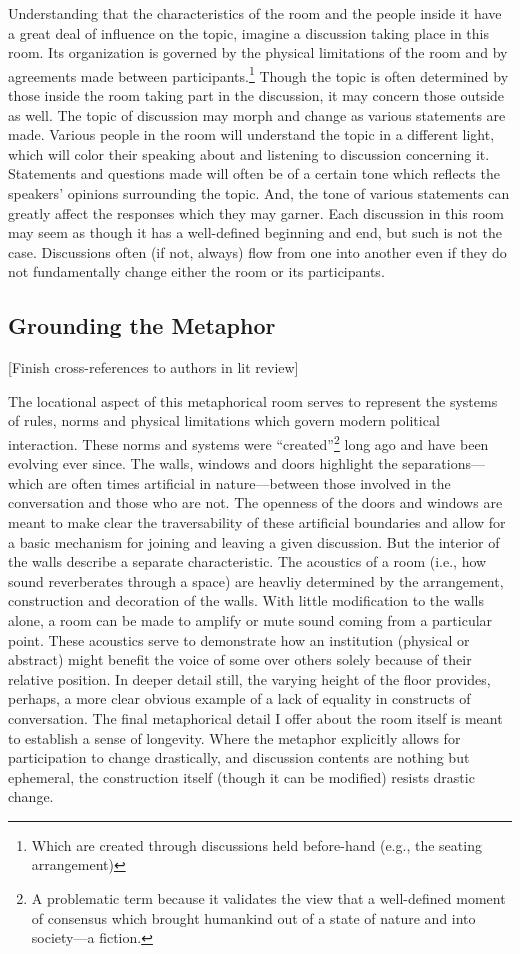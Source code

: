 \documentclass{article}
\begin{document}
Understanding that the characteristics of the room and the people inside it have a great deal of influence on the topic, imagine a discussion taking place in this room.
Its organization is governed by the physical limitations of the room and by agreements made between participants.\footnote{Which are created through discussions held before-hand (e.g., the seating arrangement)}
Though the topic is often determined by those inside the room taking part in the discussion, it may concern those outside as well.
The topic of discussion may morph and change as various statements are made.
Various people in the room will understand the topic in a different light, which will color their speaking about and listening to discussion concerning it.
Statements and questions made will often be of a certain tone which reflects the speakers' opinions surrounding the topic.
And, the tone of various statements can greatly affect the responses which they may garner.
Each discussion in this room may seem as though it has a well-defined beginning and end, but such is not the case.
Discussions often (if not, always) flow from one into another even if they do not fundamentally change either the room or its participants.

\subsection{Grounding the Metaphor}
[Finish cross-references to authors in lit review]

The locational aspect of this metaphorical room serves to represent the systems of rules, norms and physical limitations which govern modern political interaction.
These norms and systems were ``created''\footnote{A problematic term because it validates the view that a well-defined moment of consensus which brought humankind out of a state of nature and into society---a fiction.} long ago and have been evolving ever since.
The walls, windows and doors highlight the separations---which are often times artificial in nature---between those involved in the conversation and those who are not.
The openness of the doors and windows are meant to make clear the traversability of these artificial boundaries and allow for a basic mechanism for joining and leaving a given discussion.
But the interior of the walls describe a separate characteristic.
The acoustics of a room (i.e., how sound reverberates through a space) are heavliy determined by the arrangement, construction and decoration of the walls.
With little modification to the walls alone, a room can be made to amplify or mute sound coming from a particular point.
These acoustics serve to demonstrate how an institution (physical or abstract) might benefit the voice of some over others solely because of their relative position.
In deeper detail still, the varying height of the floor provides, perhaps, a more clear obvious example of a lack of equality in constructs of conversation.
The final metaphorical detail I offer about the room itself is meant to establish a sense of longevity.
Where the metaphor explicitly allows for participation to change drastically, and discussion contents are nothing but ephemeral, the construction itself (though it can be modified) resists drastic change.
\end{document}
